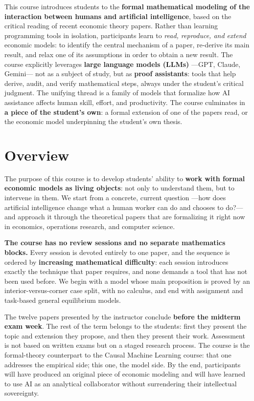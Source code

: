 \documentclass[11pt]{article}
\begin{document}
This course introduces students to the \textbf{formal mathematical modeling of the interaction between humans and artificial intelligence}, based on the critical reading of recent economic theory papers. Rather than learning programming tools in isolation, participants learn to \emph{read, reproduce, and extend} economic models: to identify the central mechanism of a paper, re-derive its main result, and relax one of its assumptions in order to obtain a new result. The course explicitly leverages \textbf{large language models (LLMs)} ---GPT, Claude, Gemini--- not as a subject of study, but as \textbf{proof assistants}: tools that help derive, audit, and verify mathematical steps, always under the student's critical judgment. The unifying thread is a family of models that formalize how AI assistance affects human skill, effort, and productivity. The course culminates in \textbf{a piece of the student's own}: a formal extension of one of the papers read, or the economic model underpinning the student's own thesis.

\section{Overview}

The purpose of this course is to develop students' ability to \textbf{work with formal economic models as living objects}: not only to understand them, but to intervene in them. We start from a concrete, current question ---how does artificial intelligence change what a human worker can do and chooses to do?--- and approach it through the theoretical papers that are formalizing it right now in economics, operations research, and computer science.

\textbf{The course has no review sessions and no separate mathematics blocks.} Every session is devoted entirely to one paper, and the sequence is ordered by \textbf{increasing mathematical difficulty}: each session introduces exactly the technique that paper requires, and none demands a tool that has not been used before. We begin with a model whose main proposition is proved by an interior-versus-corner case split, with no calculus, and end with assignment and task-based general equilibrium models.

The twelve papers presented by the instructor conclude \textbf{before the midterm exam week}. The rest of the term belongs to the students: first they present the topic and extension they propose, and then they present their work. Assessment is not based on written exams but on a staged research process. The course is the formal-theory counterpart to the Causal Machine Learning course: that one addresses the empirical side; this one, the model side. By the end, participants will have produced an original piece of economic modeling and will have learned to use AI as an analytical collaborator without surrendering their intellectual sovereignty.
\end{document}
